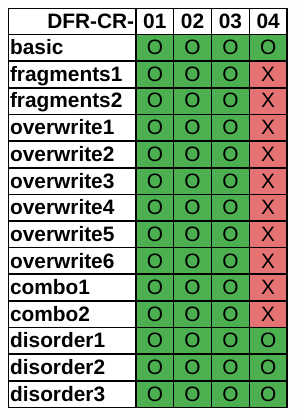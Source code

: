 \begin{figure}
\begin{subfigure}{0.3\linewidth}
        \includegraphics[width=\linewidth]{fig/recuva_results_fat.pdf}
    \end{subfigure}~~
    \begin{subfigure}{0.3\linewidth}

\end{subfigure}
\end{figure}
